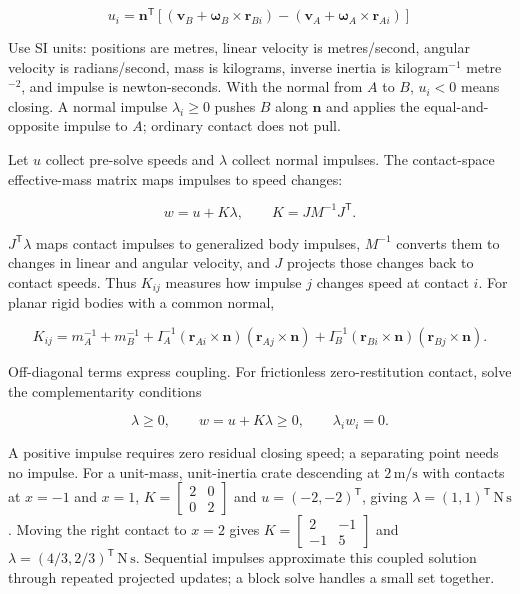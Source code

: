\[
u_i=\mathbf n^\mathsf T\left[(\mathbf v_B+\boldsymbol\omega_B\times\mathbf r_{Bi})-(\mathbf v_A+\boldsymbol\omega_A\times\mathbf r_{Ai})\right]
\]

Use SI units: positions are metres, linear velocity is metres/second, angular velocity is radians/second, mass is kilograms, inverse inertia is kilogram\(^{-1}\) metre\(^{-2}\), and impulse is newton-seconds. With the normal from \(A\) to \(B\), \(u_i<0\) means closing. A normal impulse \(\lambda_i\ge0\) pushes \(B\) along \(\mathbf n\) and applies the equal-and-opposite impulse to \(A\); ordinary contact does not pull.

Let \(u\) collect pre-solve speeds and \(\lambda\) collect normal impulses. The contact-space effective-mass matrix maps impulses to speed changes:

\[
w=u+K\lambda,\qquad K=JM^{-1}J^\mathsf T.
\]

\(J^\mathsf T\lambda\) maps contact impulses to generalized body impulses, \(M^{-1}\) converts them to changes in linear and angular velocity, and \(J\) projects those changes back to contact speeds. Thus \(K_{ij}\) measures how impulse \(j\) changes speed at contact \(i\). For planar rigid bodies with a common normal,

\[
K_{ij}=m_A^{-1}+m_B^{-1}+I_A^{-1}(\mathbf r_{Ai}\times\mathbf n)(\mathbf r_{Aj}\times\mathbf n)+I_B^{-1}(\mathbf r_{Bi}\times\mathbf n)(\mathbf r_{Bj}\times\mathbf n).
\]

Off-diagonal terms express coupling. For frictionless zero-restitution contact, solve the complementarity conditions

\[
\lambda\ge0,\qquad w=u+K\lambda\ge0,\qquad \lambda_iw_i=0.
\]

A positive impulse requires zero residual closing speed; a separating point needs no impulse. For a unit-mass, unit-inertia crate descending at \(2\,\mathrm{m/s}\) with contacts at \(x=-1\) and \(x=1\), \(K=\begin{bmatrix}2&0\\0&2\end{bmatrix}\) and \(u=(-2,-2)^\mathsf T\), giving \(\lambda=(1,1)^\mathsf T\,\mathrm{N\,s}\). Moving the right contact to \(x=2\) gives \(K=\begin{bmatrix}2&-1\\-1&5\end{bmatrix}\) and \(\lambda=(4/3,2/3)^\mathsf T\,\mathrm{N\,s}\). Sequential impulses approximate this coupled solution through repeated projected updates; a block solve handles a small set together.


